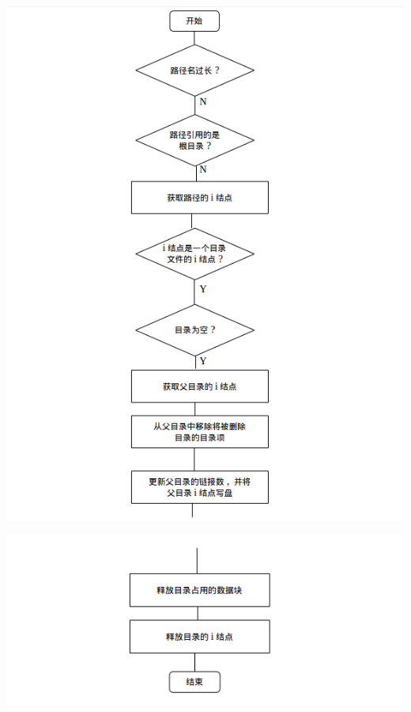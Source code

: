 \documentclass[nofonts, titlepage]{ctexart}
\begin{document}
\begin{itemize}
  \includegraphics[width=15cm]{./images/./rmdir_1.png}

  \includegraphics[width=15cm]{./images/./rmdir_2.png}
  \end{itemize}
\end{document}
